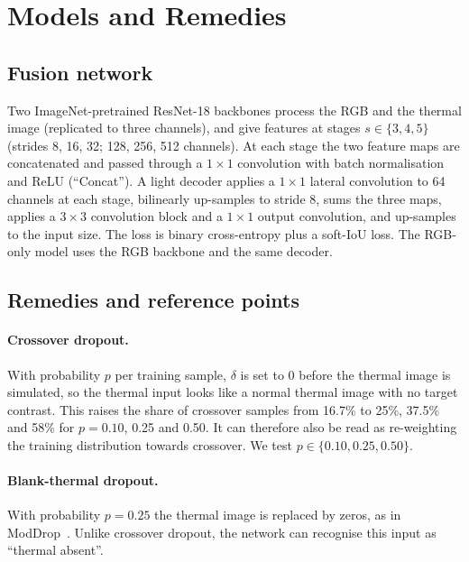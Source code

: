 \documentclass[runningheads]{llncs}
\begin{document}
\section{Models and Remedies}\label{sec:models}
\subsection{Fusion network}
Two ImageNet-pretrained ResNet-18 backbones process the RGB and the thermal image (replicated to three channels), and give features at stages $s\in\{3,4,5\}$ (strides 8, 16, 32; 128, 256, 512 channels). At each stage the two feature maps are concatenated and passed through a $1\times1$ convolution with batch normalisation and ReLU (``Concat''). A light decoder applies a $1\times1$ lateral convolution to 64 channels at each stage, bilinearly up-samples to stride 8, sums the three maps, applies a $3\times3$ convolution block and a $1\times1$ output convolution, and up-samples to the input size. The loss is binary cross-entropy plus a soft-IoU loss. The RGB-only model uses the RGB backbone and the same decoder. 

\subsection{Remedies and reference points}
\paragraph{Crossover dropout.} With probability $p$ per training sample, $\delta$ is set to 0 before the thermal image is simulated, so the thermal input looks like a normal thermal image with no target contrast. This raises the share of crossover samples from 16.7\% to 25\%, 37.5\% and 58\% for $p=0.10$, 0.25 and 0.50. It can therefore also be read as re-weighting the training distribution towards crossover. We test $p\in\{0.10,0.25,0.50\}$.

\paragraph{Blank-thermal dropout.} With probability $p=0.25$ the thermal image is replaced by zeros, as in ModDrop~\cite{moddrop}. Unlike crossover dropout, the network can recognise this input as ``thermal absent''.
\end{document}
